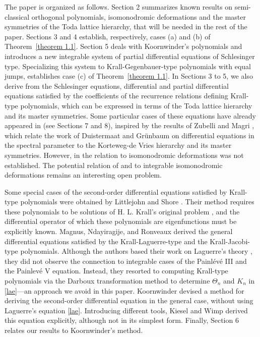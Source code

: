 \documentclass[10pt, reqno]{amsart}
\numberwithin{equation}{section}
\numberwithin{equation}{section}
\begin{document}
The paper is organized as follows. Section 2 summarizes known results on semi-classical orthogonal polynomials, isomonodromic deformations and the master symmetries of the Toda lattice hierarchy, that will be needed in the rest of the paper. Sections 3 and 4  establish, respectively, cases (a) and (b) of Theorem~\ref{theorem 1.1}. Section 5 deals with Koornwinder's polynomials and introduces a new integrable system of partial differential equations of Schlesinger type. Specializing this system to Krall-Gegenbauer-type polynomials with equal jumps, establishes case (c) of Theorem~\ref{theorem 1.1}. In Sections 3 to 5, we also derive from the Schlesinger equations, differential and partial differential equations satisfied by the coefficients of the recurrence relations defining Krall-type polynomials, which can be expressed in terms of the Toda lattice hierarchy and its master symmetries. Some particular cases of these equations have already appeared in \cite{GH2} (see Sections 7 and 8), inspired by the results of Zubelli and Magri \cite{ZM}, which relate the work of Duistermaat and Grünbaum \cite{DG} on differential equations in the spectral parameter to the Korteweg-de Vries hierarchy and its master symmetries. However, in \cite{GH2} the relation to isomonodromic deformations was not established. The potential relation of \cite{DG} and \cite{ZM} to integrable isomonodromic deformations remains an interesting open problem. 

Some special cases of the second-order differential equations satisfied by Krall-type polynomials were obtained by Littlejohn and Shore \cite{LLS, LLL2}. Their method requires these polynomials to be solutions of H. L. Krall's original problem \cite{K1}, and the differential operator of which these polynomials are eigenfunctions must be explicitly known. Magnus, Ndayiragije, and Ronveaux \cite{MNR} derived the general differential equations satisfied by the Krall-Laguerre-type and the Krall-Jacobi-type polynomials. Although the authors based their work on Laguerre's theory \cite{La}, they did not observe the connection to integrable cases of the Painlévé III and the Painlevé V equation. Instead, they resorted to computing Krall-type polynomials via the Darboux transformation method \cite{GH1, GHH, GY, Zh} to determine $\Theta_n$ and $K_n$ in \eqref{lae}\;---\;an approach we avoid in this paper. Koornwinder \cite{Ko} devised a method for deriving the second-order differential equation in the general case, without using Laguerre's equation \eqref{lae}. Introducing different tools, Kiesel and Wimp \cite{KW} derived this equation explicitly, although not in its simplest form. Finally, Section 6 relates our results to Koornwinder's method.
\end{document}
